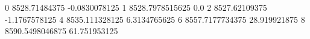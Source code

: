 0 8528.71484375 -0.0830078125
1 8528.7978515625 0.0
2 8527.62109375 -1.1767578125
4 8535.111328125 6.3134765625
6 8557.7177734375 28.919921875
8 8590.5498046875 61.751953125
